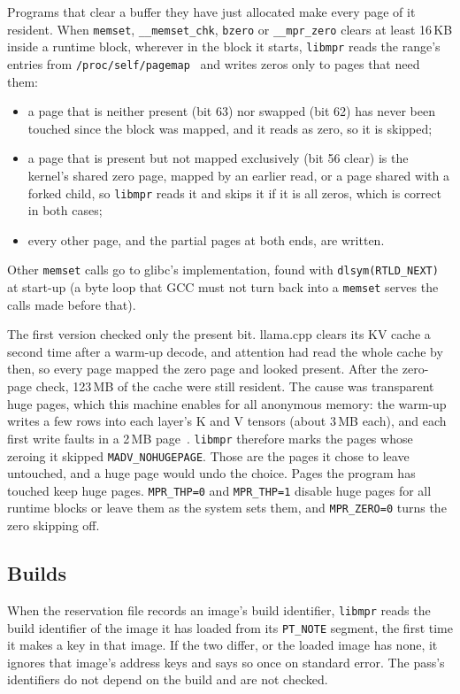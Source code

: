 \documentclass[11pt]{article}
\newcommand{\libmpr}{\texttt{libmpr}}
\begin{document}
Programs that clear a buffer they have just allocated make every page of it resident. When \texttt{memset},
\texttt{\_\_memset\_chk}, \texttt{bzero} or \texttt{\_\_mpr\_zero} clears at least 16\,KB inside a runtime block, wherever in the
block it starts, \libmpr{} reads the range's entries from \texttt{/proc/self/pagemap}~\cite{LinuxPagemap} and writes
zeros only to pages that need them:
\begin{itemize}
  \item a page that is neither present (bit 63) nor swapped (bit 62) has never been touched since the block
  was mapped, and it reads as zero, so it is skipped;
  \item a page that is present but not mapped exclusively (bit 56 clear) is the kernel's shared zero page,
  mapped by an earlier read, or a page shared with a forked child, so \libmpr{} reads it and skips it if it
  is all zeros, which is correct in both cases;
  \item every other page, and the partial pages at both ends, are written.
\end{itemize}
Other \texttt{memset} calls go to glibc's implementation, found with \texttt{dlsym(RTLD\_NEXT)} at start-up (a
byte loop that GCC must not turn back into a \texttt{memset} serves the calls made before that).

The first version checked only the present bit. llama.cpp clears its KV cache a second time after a warm-up
decode, and attention had read the whole cache by then, so every page mapped the zero page and looked present.
After the zero-page check, 123\,MB of the cache were still resident. The cause was transparent huge pages,
which this machine enables for all anonymous memory: the warm-up writes a few rows into each layer's K and V
tensors (about 3\,MB each), and each first write faults in a 2\,MB page~\cite{LinuxTHP}. \libmpr{} therefore
marks the pages whose zeroing it skipped \texttt{MADV\_NOHUGEPAGE}. Those are the pages it chose to leave
untouched, and a huge page would undo the choice. Pages the program has touched keep huge pages.
\texttt{MPR\_THP=0} and \texttt{MPR\_THP=1} disable huge pages for all runtime blocks or leave them as the system
sets them, and \texttt{MPR\_ZERO=0} turns the zero skipping off.

\subsection{Builds}
\label{sec:runtime-build}

When the reservation file records an image's build identifier, \libmpr{} reads the build identifier of the image
it has loaded from its \texttt{PT\_NOTE} segment, the first time it makes a key in that image. If the two differ,
or the loaded image has none, it ignores that image's address keys and says so once on standard error. The pass's
identifiers do not depend on the build and are not checked.
\end{document}
